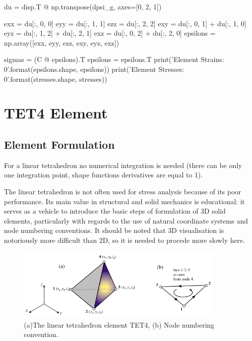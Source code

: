 \documentclass[10pt,b5paper,titlepage]{book}
\begin{document}
\begin{python}
    du = disp.T @ np.transpose(dpsi_g, axes=[0, 2, 1])

    exx = du[:, 0, 0]
    eyy = du[:, 1, 1]
    ezz = du[:, 2, 2]
    exy = du[:, 0, 1] + du[:, 1, 0]
    eyz = du[:, 1, 2] + du[:, 2, 1]
    exz = du[:, 0, 2] + du[:, 2, 0]
    epsilons = np.array([exx, eyy, ezz, exy, eyz, exz])

    sigmas = (C @ epsilons).T
    epsilons = epsilons.T
    print('Element Strains: {0}'.format(epsilons.shape, epsilons))
    print('Element Stresses: {0}'.format(stresses.shape, stresses))
\end{python}




\newpage
\section{TET4 Element}

\subsection{Element Formulation}
For a linear tetrahedron no numerical integration is needed (there can be only
one integration point, shape functions derivatives are equal to 1).

The linear tetrahedron is not often used for stress analysis because of its poor
performance. Its main value in structural and solid mechanics is educational:
it serves as a vehicle to introduce the basic steps of formulation of 3D solid elements,
particularly with regards to the use of natural coordinate systems and node numbering
conventions. It should be noted that 3D visualisation is notoriously more difficult
than 2D, so it is needed to procede more slowly here.

\begin{figure}[ht]
    \centering
    \includegraphics[width=0.90\textwidth]{img/linear_tetrahedron.png}
    \caption{(a)The linear tetrahedron element TET4, (b) Node numbering convention.}
    \label{fig:linear-tetrahedron-png}
\end{figure}
\end{document}
